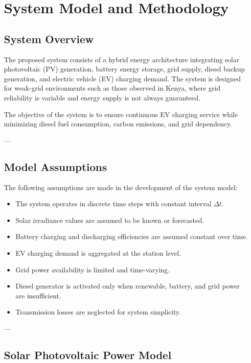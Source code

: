 \section{System Model and Methodology}

\subsection{System Overview}

The proposed system consists of a hybrid energy architecture integrating solar photovoltaic (PV) generation, battery energy storage, grid supply, diesel backup generation, and electric vehicle (EV) charging demand. The system is designed for weak-grid environments such as those observed in Kenya, where grid reliability is variable and energy supply is not always guaranteed.

The objective of the system is to ensure continuous EV charging service while minimizing diesel fuel consumption, carbon emissions, and grid dependency.

---

\subsection{Model Assumptions}

The following assumptions are made in the development of the system model:

\begin{itemize}
    \item The system operates in discrete time steps with constant interval $\Delta t$.
    \item Solar irradiance values are assumed to be known or forecasted.
    \item Battery charging and discharging efficiencies are assumed constant over time.
    \item EV charging demand is aggregated at the station level.
    \item Grid power availability is limited and time-varying.
    \item Diesel generator is activated only when renewable, battery, and grid power are insufficient.
    \item Transmission losses are neglected for system simplicity.
\end{itemize}

---

\subsection{Solar Photovoltaic Power Model}

